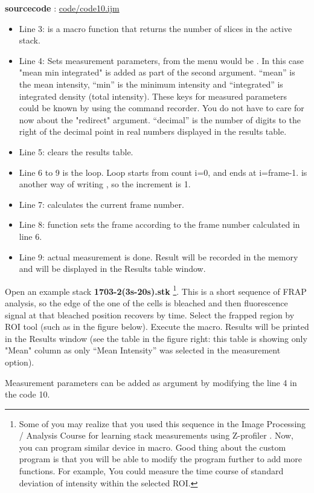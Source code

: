 \textbf{sourcecode} : \href{http://www.example.com/contents}{code/code10.ijm}

\begin{itemize}
\item Line 3:  is a macro function that returns the number of slices in the active stack.

\item Line 4: Sets measurement parameters, from the menu would be . In this case "mean min integrated" is added as part of the second argument. ``mean'' is the mean intensity, ``min'' is the minimum intensity and ``integrated'' is integrated density (total intensity). These keys for measured parameters could be known by using the command recorder. 
You do not have to care for now about the "redirect" argument. ``decimal'' is the number of digits to 
the right of the decimal point in real numbers displayed in the results table.

\item Line 5: clears the results table.

\item Line 6 to 9 is the loop. Loop starts from count i=0, and ends at i=frame-1.  is another way of writing , so the increment is 1.

\item Line 7: calculates the current frame number.

\item Line 8:  function sets the frame according to the frame number calculated in line 6.

\item Line 9:  actual measurement is done. 
Result will be recorded in the memory and will be displayed in the Results table window. 

\end{itemize}

Open an example stack \textbf{1703-2(3s-20s).stk} 
\footnote{Some of you may realize that you used this sequence 
in the Image Processing / Analysis Course for learning 
stack measurements using Z-profiler . Now, you can program similar 
device in macro. 
Good thing about the custom program
is that you will be able to modify the program further to add more functions.
For example, You could measure the time course of standard deviation of
intensity within the selected ROI.}. This is a short sequence of FRAP analysis,
so the edge of the one of the cells is bleached and then fluorescence signal at that bleached position recovers by time. 
Select the frapped region by ROI tool (such as in the figure below). 
Execute the macro. Results will be printed in the Results window (see the table in the figure right: this table is showing only "Mean" column as only ``Mean Intensity'' was selected in the measurement option).

Measurement parameters can be added as argument by modifying the line 4 in the code 10.